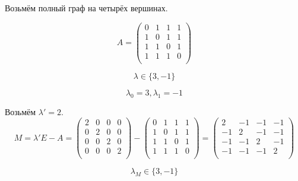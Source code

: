 \begin{example}
Возьмём полный граф на четырёх вершинах.
\begin{center}
  \end{center}
 
$$ A =
  \left({
  \begin{array}{rrrrrr}
  0 & 1 & 1 & 1 \\
  1 & 0 & 1 & 1 \\
  1 & 1 & 0 & 1 \\
  1 & 1 & 1 & 0 \\
  \end{array}
  }\right)
$$

$$\lambda \in \{3,-1\}$$

$$\lambda_0 = 3, \lambda_1 = -1$$

Возьмём $\lambda' = 2$.
$$
M = \lambda'E - A =
\left({
  \begin{array}{rrrrrr}
  2 & 0 & 0 & 0 \\
  0 & 2 & 0 & 0 \\
  0 & 0 & 2 & 0 \\
  0 & 0 & 0 & 2 \\
  \end{array}
  }\right)
  -
  \left({
  \begin{array}{rrrrrr}
  0 & 1 & 1 & 1 \\
  1 & 0 & 1 & 1 \\
  1 & 1 & 0 & 1 \\
  1 & 1 & 1 & 0 \\
  \end{array}
  }\right)
  =
  \left({
  \begin{array}{rrrrrr}
   2 & -1 & -1 & -1 \\
  -1 &  2 & -1 & -1 \\
  -1 & -1 &  2 & -1 \\
  -1 & -1 & -1 &  2 \\
  \end{array}
  }\right)
$$

$$\lambda_M \in \{3,-1\}$$


\end{example}
